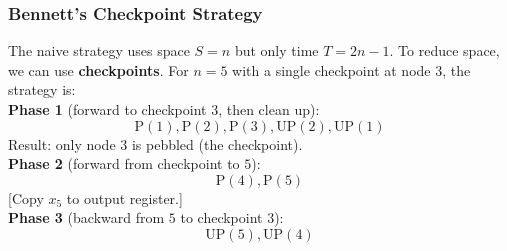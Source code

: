\subsubsection{Bennett's Checkpoint Strategy}
The naive strategy uses space $S=n$ but only time $T=2n-1$. To reduce space, we can use \textbf{checkpoints}. For $n=5$ with a single checkpoint at node $3$, the strategy is: \\

\textbf{Phase 1} (forward to checkpoint $3$, then clean up):
\begin{equation}
    \mathrm{P(1), P(2), P(3), UP(2), UP(1)}
\end{equation}
Result: only node $3$ is pebbled (the checkpoint). \\

\textbf{Phase 2} (forward from checkpoint to $5$):
\begin{equation}
    \mathrm{P(4), P(5)}
\end{equation}
[Copy $x_5$ to output register.]\\ 

\textbf{Phase 3} (backward from $5$ to checkpoint $3$): \\
\begin{equation}
    \mathrm{UP(5), UP(4)}
\end{equation}

